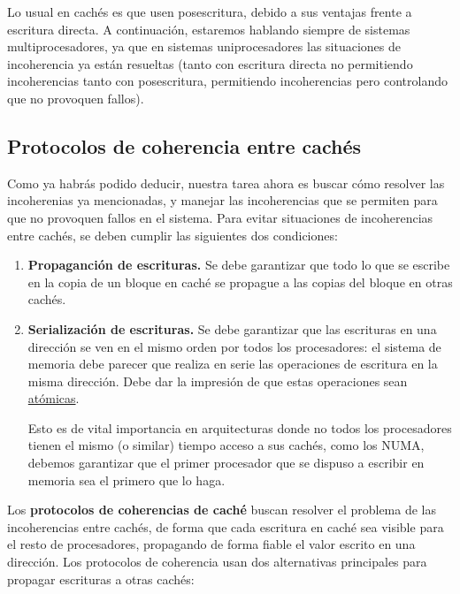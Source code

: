 Lo usual en cachés es que usen posescritura, debido a sus ventajas frente a escritura directa. A continuación, estaremos hablando siempre de sistemas multiprocesadores, ya que en sistemas uniprocesadores las situaciones de incoherencia ya están resueltas (tanto con escritura directa no permitiendo incoherencias tanto con posescritura, permitiendo incoherencias pero controlando que no provoquen fallos).

\subsection{Protocolos de coherencia entre cachés}
Como ya habrás podido deducir, nuestra tarea ahora es buscar cómo resolver las incoherenias ya mencionadas, y manejar las incoherencias que se permiten para que no provoquen fallos en el sistema. Para evitar situaciones de incoherencias entre cachés, se deben cumplir las siguientes dos condiciones:
\begin{enumerate}
    \item \textbf{Propaganción de escrituras.} Se debe garantizar que todo lo que se escribe en la copia de un bloque en caché se propague a las copias del bloque en otras cachés.
    \item \textbf{Serialización de escrituras.} Se debe garantizar que las escrituras en una dirección se ven en el mismo orden por todos los procesadores: el sistema de memoria debe parecer que realiza en serie las operaciones de escritura en la misma dirección. Debe dar la impresión de que estas operaciones sean \underline{atómicas}. 

        Esto es de vital importancia en arquitecturas donde no todos los procesadores tienen el mismo (o similar) tiempo acceso a sus cachés, como los NUMA, debemos garantizar que el primer procesador que se dispuso a escribir en memoria sea el primero que lo haga.
\end{enumerate}
Los \textbf{protocolos de coherencias de caché} buscan resolver el problema de las incoherencias entre cachés, de forma que cada escritura en caché sea visible para el resto de procesadores, propagando de forma fiable el valor escrito en una dirección. Los protocolos de coherencia usan dos alternativas principales para propagar escrituras a otras cachés:
